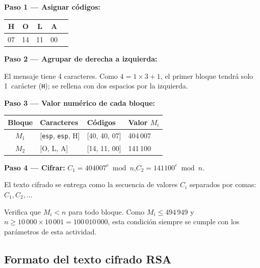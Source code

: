 \documentclass[12pt, oneside]{article}
\begin{document}
\begin{ejemplo}

\textbf{Paso 1 — Asignar códigos:}

\begin{center}
\renewcommand{\arraystretch}{1.2}
\begin{tabular}{ccccc}
\toprule
H & O & L & A \\
\midrule
07 & 14 & 11 & 00 \\
\bottomrule
\end{tabular}
\end{center}

\textbf{Paso 2 — Agrupar de derecha a izquierda:}

El mensaje tiene 4 caracteres.  Como $4 = 1 \times 3 + 1$, el primer
bloque tendrá solo 1~carácter (\texttt{H}); se rellena con dos
espacios por la izquierda.

\textbf{Paso 3 — Valor numérico de cada bloque:}

\begin{center}
\renewcommand{\arraystretch}{1.3}
\begin{tabular}{clll}
\toprule
\textbf{Bloque} & \textbf{Caracteres} & \textbf{Códigos} & \textbf{Valor $M_i$} \\
\midrule
$M_1$ & [\texttt{esp}, \texttt{esp}, H] & [40, 40, 07] & 404\,007 \\
$M_2$ & [O, L, A]                       & [14, 11, 00] & 141\,100 \\
\bottomrule
\end{tabular}
\end{center}

\textbf{Paso 4 — Cifrar:}\quad
$C_1 = 404007^e \bmod n$,\quad $C_2 = 141100^e \bmod n$.

El texto cifrado se entrega como la secuencia de valores $C_i$
separados por comas: $C_1, C_2, \ldots$

\end{ejemplo}

\begin{advertencia}
  Verifica que $M_i < n$ para todo bloque.  Como $M_i \le 494\,949$
  y $n \ge 10\,000 \times 10\,001 = 100\,010\,000$, esta condición
  siempre se cumple con los parámetros de esta actividad.
\end{advertencia}

\subsection{Formato del texto cifrado RSA}
\end{document}
